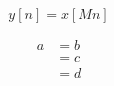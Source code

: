 \begin{equation}
    y[n] = x[Mn]
\end{equation}\label{eq:1}

\begin{align*}
    a &= b \\
    &= c \\
    &= d
\end{align*}\label{alligned:1}
